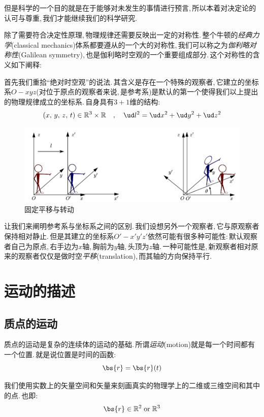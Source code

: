 但是科学的一个目的就是在于能够对未发生的事情进行预言,\,所以本着对决定论的认可与尊重,\,我们才能继续我们的科学研究.

\vspace{1cm}

除了需要符合决定性原理,\,物理规律还需要反映出一定的对称性.\,整个牛顿的\emph{经典力学}(classical mechanics)体系都要遵从的一个大的对称性,\,我们可以称之为\emph{伽利略对称性}(Galilean symmetry),\,也是伽利略时空观的一个重要组成部分.\,这个对称性的含义如下阐释:

首先我们重拾``绝对时空观''的说法.\,其含义是存在一个特殊的观察者,\,它建立的坐标系$O-xyz$(对位于原点的观察者来说,\,是参考系)是默认的第一个使得我们以上提出的物理规律成立的坐标系.\,自身具有$3+1$维的结构:
\[(x,\,y,\,z,\,t)\in \mathbb{R}^3\times \mathbb{R}\quad,\quad \ud l^2=\ud x^2+\ud y^2+\ud z^2\]

\begin{figure}[H]
\centering
\includegraphics[width=12cm]{image/6-1-15.png}
\caption{固定平移与转动}
\end{figure}

让我们来阐明参考系与坐标系之间的区别.\,我们设想另外一个观察者,\,它与原观察者保持相对静止.\,但是其建立的坐标系$O'-x'y'z'$依然可能有很多种可能性:\,默认观察者自己为原点,\,右手边为$x$轴,\,胸前为$y$轴,\,头顶为$z$轴.\,一种可能性是,\,新观察者相对原来的观察者仅仅是做时空\emph{平移}(translation),\,而其轴的方向保持平行.\,






\section{运动的描述}

\subsection{质点的运动}
质点的运动是复杂的连续体的运动的基础.\,所谓\emph{运动}(motion)就是每一个时间都有一个位置.\,就是说位置是时间的函数:
\[\bs{r}=\bs{r}(t)\]

我们使用实数上的矢量空间和矢量来刻画真实的物理学上的二维或三维空间和其中的点.\,也即:
\[\bs{r}\in\mathbb{R}^2 \;{\rm or}\; \mathbb{R}^3\]

